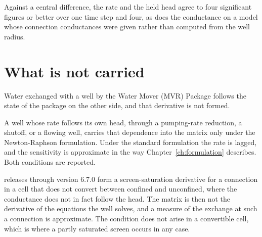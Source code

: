 Against a central difference, the rate and the held head agree to four significant figures or better over one time step and four, as does the conductance on a model whose connection conductances were given rather than computed from the well radius.

\section*{What is not carried}

Water exchanged with a well by the Water Mover (MVR) Package follows the state of the package on the other side, and that derivative is not formed.

A well whose rate follows its own head, through a pumping-rate reduction, a shutoff, or a flowing well, carries that dependence into the matrix only under the Newton-Raphson formulation. Under the standard formulation the rate is lagged, and the sensitivity is approximate in the way Chapter~\ref{ch:formulation} describes. Both conditions are reported.

\mf{} releases through version 6.7.0 form a screen-saturation derivative for a connection in a cell that does not convert between confined and unconfined, where the conductance does not in fact follow the head. The matrix is then not the derivative of the equations the well solves, and a measure of the exchange at such a connection is approximate. The condition does not arise in a convertible cell, which is where a partly saturated screen occurs in any case.
